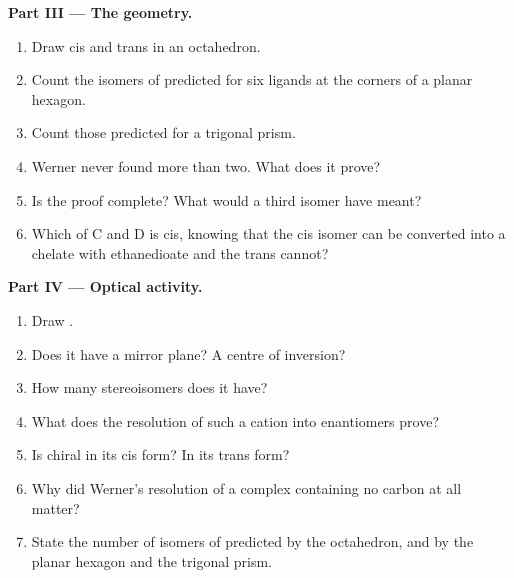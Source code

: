 \begin{problem}
\medskip
\noindent\textbf{Part III --- The geometry.}
\begin{enumerate}[resume]
  \item Draw cis and trans \ce{[CoCl2(NH3)4]+} in an octahedron.
  \item Count the isomers of \ce{[CoCl2(NH3)4]+} predicted for six ligands at the
        corners of a planar hexagon.
  \item Count those predicted for a trigonal prism.
  \item Werner never found more than two. What does it prove?
  \item Is the proof complete? What would a third isomer have meant?
  \item Which of C and D is cis, knowing that the cis isomer can be converted into a
        chelate with ethanedioate and the trans cannot?
\end{enumerate}

\medskip
\noindent\textbf{Part IV --- Optical activity.}
\begin{enumerate}[resume]
  \item Draw .
  \item Does it have a mirror plane? A centre of inversion?
  \item How many stereoisomers does it have?
  \item What does the resolution of such a cation into enantiomers prove?
  \item Is \ce{[CoCl2(en)2]+} chiral in its cis form? In its trans form?
  \item Why did Werner's resolution of a complex containing no carbon at all matter?
  \item State the number of isomers of \ce{[CoCl2(NH3)4]+} predicted by the octahedron,
        and by the planar hexagon and the trigonal prism.
\end{enumerate}
\end{problem}
